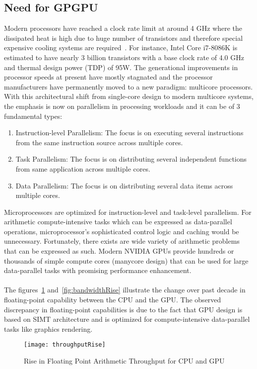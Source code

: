 \documentclass[thesis.tex]{subfiles}
\begin{document}
\subsection{Need for GPGPU}
Modern processors have reached a clock rate limit at around 4 GHz where the dissipated heat is high due to huge number of transistors and therefore special expensive cooling systems are required~\cite{ElsevierCUDA}.  For instance, Intel Core i7-8086K is estimated to have nearly 3 billion transistors with a base clock rate of 4.0 GHz and thermal design power (TDP) of 95W. The generational improvements in processor speeds at present have mostly stagnated and the processor manufacturers have permanently moved to a new paradigm: multicore processors. With this architectural shift from single-core design to modern multicore systems, the emphasis is now on parallelism in processing workloads and it can be of 3 fundamental types:
\begin{enumerate}
	\item Instruction-level Parallelism: The focus is on executing several instructions from the same instruction source across multiple cores.
	\item Task Parallelism: The focus is on distributing several independent functions from same application across multiple cores.
	\item Data Parallelism: The focus is on distributing several data items across multiple cores.
\end{enumerate}
Microprocessors are optimized for instruction-level and task-level parallelism. For arithmetic compute-intensive tasks which can be expressed as data-parallel operations, microprocessor’s sophisticated control logic and caching would be unnecessary. Fortunately, there exists are wide variety of arithmetic problems that can be expressed as such. Modern NVIDIA GPUs provide hundreds or thousands of simple compute cores (manycore design) that can be used for large data-parallel tasks with promising performance enhancement.\\\\
The figures~\ref{fig:throughputRise} and~\ref{fig:bandwidthRise} illustrate the change over past decade in floating-point capability between the CPU and the GPU. The observed discrepancy in floating-point capabilities is due to the fact that GPU design is based on SIMT architecture and is optimized for compute-intensive data-parallel tasks like graphics rendering. 
\begin{figure}[H]
	\centering
	\texttt{[image: throughputRise]}
	\caption{Rise in Floating Point Arithmetic Throughput for CPU and GPU~\cite{cuda}}
	\label{fig:throughputRise}
\end{figure}
\end{document}
